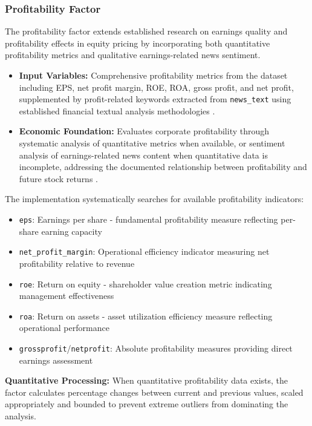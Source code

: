 \documentclass[3p,times,procedia]{elsarticle}
\begin{document}
\subsubsection{{Profitability Factor}}

The profitability factor extends established research on earnings quality and profitability effects in equity pricing \cite{Zhang2006} by incorporating both quantitative profitability metrics and qualitative earnings-related news sentiment.

\begin{itemize}
    \item \textbf{Input Variables:} Comprehensive profitability metrics from the dataset \cite{FinReportDataset2025} including EPS, net profit margin, ROE, ROA, gross profit, and net profit, supplemented by profit-related keywords extracted from \texttt{news\_text} using established financial textual analysis methodologies \cite{Loughran2011}.
    \item \textbf{Economic Foundation:} Evaluates corporate profitability through systematic analysis of quantitative metrics when available, or sentiment analysis of earnings-related news content when quantitative data is incomplete, addressing the documented relationship between profitability and future stock returns \cite{Zhang2006}.
\end{itemize}

The implementation systematically searches for available profitability indicators:

\begin{itemize}
    \item \texttt{eps}: Earnings per share - fundamental profitability measure reflecting per-share earning capacity
    \item \texttt{net\_profit\_margin}: Operational efficiency indicator measuring net profitability relative to revenue
    \item \texttt{roe}: Return on equity - shareholder value creation metric indicating management effectiveness
    \item \texttt{roa}: Return on assets - asset utilization efficiency measure reflecting operational performance
    \item \texttt{grossprofit}/\texttt{netprofit}: Absolute profitability measures providing direct earnings assessment
\end{itemize}

\textbf{Quantitative Processing:} When quantitative profitability data exists, the factor calculates percentage changes between current and previous values, scaled appropriately and bounded to prevent extreme outliers from dominating the analysis.
\end{document}
